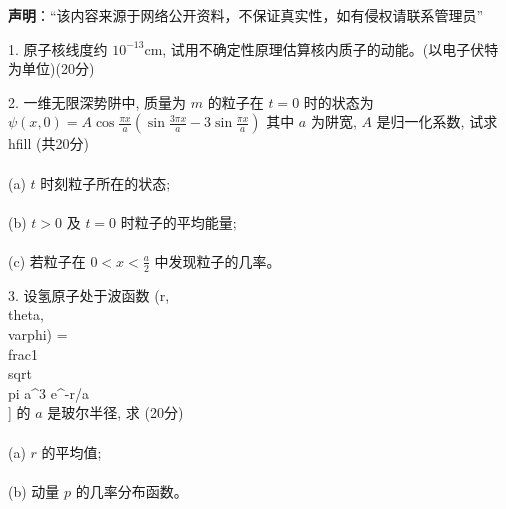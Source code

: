 
\textbf{声明}：“该内容来源于网络公开资料，不保证真实性，如有侵权请联系管理员”

1. 原子核线度约 $10^{-13} \text{cm}$, 试用不确定性原理估算核内质子的动能。(以电子伏特为单位)\hfill (20分)

2. 一维无限深势阱中, 质量为 $m$ 的粒子在 $t=0$ 时的状态为 
$\psi(x,0) = A \cos \frac{\pi x}{a} \left( \sin \frac{3 \pi x}{a} - 3 \sin \frac{\pi x}{a} \right)$
其中 $a$ 为阱宽, $A$ 是归一化系数, 试求 \\hfill (共20分) \\\\
\quad (a) $t$ 时刻粒子所在的状态; \\\\
\quad (b) $t>0$ 及 $t=0$ 时粒子的平均能量; \\\\
\quad (c) 若粒子在 $0 < x < \frac{a}{2}$ 中发现粒子的几率。

3. 设氢原子处于波函数 
\psi(r, \\theta, \\varphi) = \\frac{1}{\\sqrt{\\pi a^3}} e^{-r/a}\\]
的 $a$ 是玻尔半径, 求 \hfill (20分) \\\\
\quad (a) $r$ 的平均值; \\\\
\quad (b) 动量 $p$ 的几率分布函数。